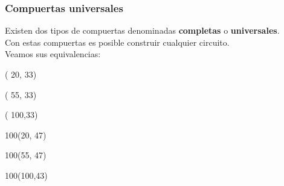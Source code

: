 \documentclass[aspectratio=169]{beamer}
\begin{document}
\begin{frame}[fragile,t]
    \frametitle{Compuertas universales}
    Existen dos tipos de compuertas denominadas \textbf{completas} o \textbf{universales}.\\
    Con estas compuertas es posible construir cualquier circuito.\\
    \bigskip
    Veamos sus equivalencias:
    \begin{textblock}{15}( 20, 33)    \end{textblock} %
    \begin{textblock}{25}( 55, 33)    \end{textblock} %
    \begin{textblock}{25}( 100,33)   \end{textblock} %
    \begin{textblock}{100}(20, 47)   \end{textblock} %
    \begin{textblock}{100}(55, 47)   \end{textblock} %
    \begin{textblock}{100}(100,43)  \end{textblock} %

\end{frame}
\end{document}
